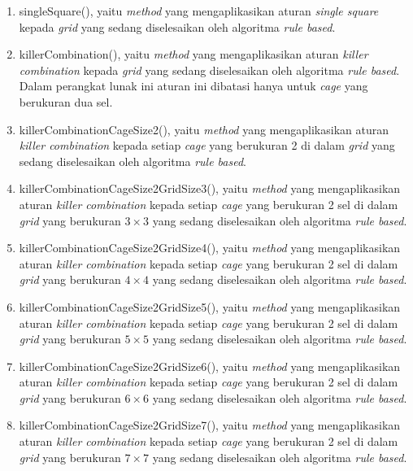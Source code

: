 \begin{enumerate}
\item singleSquare(), yaitu \textit{method} yang mengaplikasikan aturan \textit{single square} kepada \textit{grid} yang sedang diselesaikan oleh algoritma \textit{rule based}.
\item killerCombination(), yaitu \textit{method} yang mengaplikasikan aturan \textit{killer combination} kepada \textit{grid} yang sedang diselesaikan oleh algoritma \textit{rule based}. Dalam perangkat lunak ini aturan ini dibatasi hanya untuk \textit{cage} yang berukuran dua sel.
\item killerCombinationCageSize2(), yaitu \textit{method} yang mengaplikasikan aturan \textit{killer combination} kepada setiap \textit{cage} yang berukuran 2 di dalam \textit{grid} yang sedang diselesaikan oleh algoritma \textit{rule based}.
\item killerCombinationCageSize2GridSize3(), yaitu \textit{method} yang mengaplikasikan aturan \textit{killer combination} kepada setiap \textit{cage} yang berukuran 2 sel di dalam \textit{grid} yang berukuran \begin{math}3 \times 3\end{math} yang sedang diselesaikan oleh algoritma \textit{rule based}.
\item killerCombinationCageSize2GridSize4(), yaitu \textit{method} yang mengaplikasikan aturan \textit{killer combination} kepada setiap \textit{cage} yang berukuran 2 sel di dalam \textit{grid} yang berukuran \begin{math}4 \times 4\end{math} yang sedang diselesaikan oleh algoritma \textit{rule based}.
\item killerCombinationCageSize2GridSize5(), yaitu \textit{method} yang mengaplikasikan aturan \textit{killer combination} kepada setiap \textit{cage} yang berukuran 2 sel di dalam \textit{grid} yang berukuran \begin{math}5 \times 5\end{math} yang sedang diselesaikan oleh algoritma \textit{rule based}.
\item killerCombinationCageSize2GridSize6(), yaitu \textit{method} yang mengaplikasikan aturan \textit{killer combination} kepada setiap \textit{cage} yang berukuran 2 sel di dalam \textit{grid} yang berukuran \begin{math}6 \times 6\end{math} yang sedang diselesaikan oleh algoritma \textit{rule based}.
\item killerCombinationCageSize2GridSize7(), yaitu \textit{method} yang mengaplikasikan aturan \textit{killer combination} kepada setiap \textit{cage} yang berukuran 2 sel di dalam \textit{grid} yang berukuran \begin{math}7 \times 7\end{math} yang sedang diselesaikan oleh algoritma \textit{rule based}.

\end{enumerate}
